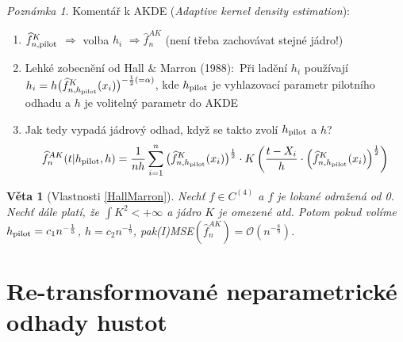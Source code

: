 \documentclass{article}
\newtheorem{theorem}[subsubsection]{Věta}
\theoremstyle{remark}
\newtheorem*{remark}{Poznámka}
\theoremstyle{plain}
\theoremstyle{definition}
\theoremstyle{remark}
\begin{document}
\newpage

\begin{remark}
Komentář k AKDE (\textit{Adaptive kernel density estimation}):
\begin{enumerate}
    \item $\widehat{f}_{n,\textnormal{pilot}}^K$ $\Rightarrow$ volba $h_i$ $\Rightarrow \widehat{f}_n^{AK}$ (není třeba zachovávat stejné jádro!)
    \item Lehké zobecnění od Hall $\&$ Marron (1988):\ \newline Při ladění $h_i$ používají $h_i=h\big(\widehat{f}_{n,h_{\textnormal{pilot}}}^K(x_i)\big)^{-\frac{1}{2}(=\alpha)}$, kde $h_{\textnormal{pilot}}$ je vyhlazovací parametr pilotního odhadu a $h$ je volitelný parametr do AKDE
    \item Jak tedy vypadá jádrový odhad, když se takto zvolí $h_{\textnormal{pilot}}$ a $h$?
    \begin{equation}
        \widehat{f}_n^{AK}(t|h_{\textnormal{pilot}},h)=\frac{1}{nh}\sum_{i=1}^n \big(\widehat{f}^K_{n,h_{\textnormal{pilot}}}(x_i)\big)^{\frac{1}{2}}\cdot K\left(\frac{t-X_i}{h}\cdot\left(\widehat{f}^K_{n,h_{\textnormal{pilot}}}(x_i)\right)^{\frac{1}{2}}\right)
        \label{HallMarron}
    \end{equation}
\end{enumerate}
\end{remark}

\begin{theorem}[Vlastnosti \eqref{HallMarron}]
Nechť $f\in C^{(4)}$ a $f$ je lokané odražená od 0. Nechť dále platí, že \newline$\int K^2 < +\infty$ a jádro $K$ je omezené atd. Potom pokud volíme $h_{\textnormal{pilot}}=c_1n^{-\frac{1}{5}}$, $h=c_2n^{-\frac{1}{9}}$, pak\newline (I)MSE$(\widehat{f}^{AK}_n)=\mathcal{O}(n^{-\frac{8}{9}})$.
\end{theorem}

\section{Re-transformované neparametrické odhady hustot}
\end{document}
